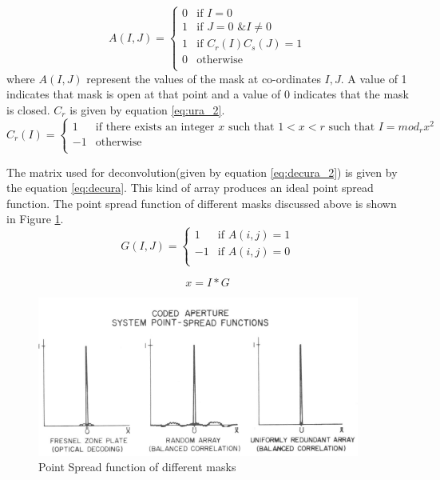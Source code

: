 \begin{equation}
  A(I,J) =
  \begin{cases}
    0 & \text{if $I = 0$} \\
    1 & \text{if $J = 0$ \& $I\neq 0$} \\
    1 & \text{if $C_r(I)C_s(J) = 1$} \\
    0 & \text{otherwise}\\
  \end{cases}
  \label{eq:ura}
\end{equation}
where $A(I,J)$ represent the values of the mask at co-ordinates $I,J$. A value of 1 indicates that mask is open at that point and a value of 0 indicates that the mask is closed. $C_r$ is given by equation \ref{eq:ura_2}.
\begin{equation}
  C_r(I) =
  \begin{cases}
    1 & \text{if there exists an integer $x$ such that 
    $1<x<r$ 
    such that $I = mod_rx^2$    
    } \\
    -1 & \text{otherwise} \\
  \end{cases}
  \label{eq:ura_2}
\end{equation}

The matrix used for deconvolution(given by equation \ref{eq:decura_2}) is given by the equation \ref{eq:decura}. This kind of array produces an ideal point spread function. The point spread function of different masks discussed above is shown in Figure \ref{fig:psf_old_mask}.
\begin{equation}
  G(I,J) =
  \begin{cases}
    1 & \text{if $A(i,j) = 1$} \\
    -1 & \text{if $A(i,j) = 0$} \\
  \end{cases}
  \label{eq:decura}
\end{equation}

\begin{equation}
x = I * G
\label{eq:decura_2}
\end{equation}

\begin{figure}[ht]
\includegraphics[width=\textwidth]{pics/psf_mask}
\caption{Point Spread function of different masks\cite{Fenimore:78}}
\label{fig:psf_old_mask}
\end{figure}

